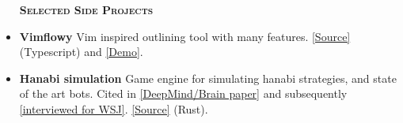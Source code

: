 \documentclass[11 pt]{article}
\begin{document}
\begin{itemize}







\begin{center}\begin{large}\textsc{\textbf{Selected Side Projects}\\}\end{large}\end{center}
 \setlength\itemsep{0em}
\item \textbf{Vimflowy}
Vim inspired outlining tool with many features. \href{https://github.com/WuTheFWasThat/vimflowy}{[Source]} (Typescript) and \href{https://vimflowy.netlify.com}{[Demo]}.
\item \textbf{Hanabi simulation}
  Game engine for simulating hanabi strategies, and state of the art bots.  Cited in \href{https://arxiv.org/abs/1902.00506}{[DeepMind/Brain paper]} and subsequently \href{https://www.wsj.com/articles/why-the-card-game-hanabi-is-the-next-big-hurdle-for-artificial-intelligence-11553875351?mod=rsswn}{[interviewed for WSJ]}. \href{https://github.com/WuTheFWasThat/hanabi.rs}{[Source]} (Rust).


\end{itemize}
\end{document}

